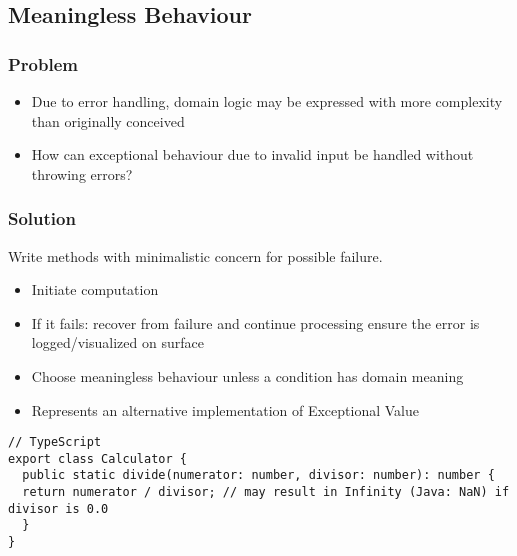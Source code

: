 \subsection{Meaningless Behaviour}
\subsubsection{Problem}
\begin{itemize}[topsep=0pt]
    \itemsep -0.4em
    \item Due to error handling, domain logic may be expressed with more complexity than originally conceived
    \item How can exceptional behaviour due to invalid input be handled without throwing errors?
\end{itemize}
\subsubsection{Solution}
Write methods with minimalistic concern for possible failure.
\begin{itemize}[topsep=0pt]
    \itemsep -0.4em
    \item Initiate computation
    \item If it fails:
        \SubItem recover from failure and continue processing
        \SubItem ensure the error is logged/visualized on surface
    \item Choose meaningless behaviour unless a condition has domain meaning 
    \item Represents an alternative implementation of Exceptional Value
\end{itemize}
\begin{lstlisting}[style=htmlcssjs]
// TypeScript
export class Calculator {
  public static divide(numerator: number, divisor: number): number {
  return numerator / divisor; // may result in Infinity (Java: NaN) if divisor is 0.0
  }
}
\end{lstlisting}

